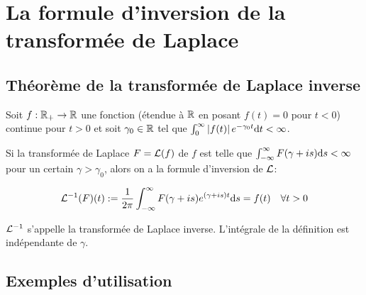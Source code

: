 \section{La formule d'inversion de la transformée de Laplace}

\subsection{Théorème de la transformée de Laplace inverse}

\begin{theorem}
    Soit $f: \mathbb{R}_+ \rightarrow \mathbb{R}$ une fonction (étendue à $\mathbb{R}$ en posant $f(t) = 0$ pour $t < 0$) continue pour $t > 0$ et soit $\gamma_0 \in \mathbb{R}$ tel que $\int_0^\infty \left|f(t)\right|e^{-\gamma_0 t}\mathrm{d}t < \infty$.
    
    Si la transformée de Laplace $F = \mathcal{L}(f)$ de $f$ est telle que $\int_{-\infty}^\infty F(\gamma + is) \mathrm{d}s < \infty$ pour un certain $\gamma > \gamma_0$, alors on a la formule d'inversion de $\mathcal{L}$:
    
    \[ \mathcal{L}^{-1}(F)(t) := \frac{1}{2\pi} \int_{-\infty}^\infty F(\gamma + is) e^{(\gamma + is) t} \mathrm{d}s = f(t) \quad \forall t > 0 \]
    
    $\mathcal{L}^{-1}$ s'appelle la transformée de Laplace inverse.
    L'intégrale de la définition est indépendante de $\gamma$.
\end{theorem}

\subsection{Exemples d'utilisation}

